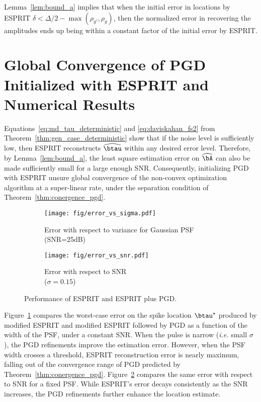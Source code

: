 \documentclass[conference,english]{IEEEtran}
\begin{document}
Lemma~\ref{lem:bound_a} implies that when the initial error in locations by ESPRIT $\delta< \Delta/2 - \max\left({\rho_{g'},\rho_g}\right)$, then the normalized error in recovering the amplitudes ends up being within a constant factor of the initial error by ESPRIT.

\section{Global Convergence of PGD Initialized with ESPRIT and Numerical Results}\label{sec:experiments}


Equations~\eqref{eq:md_tau_deterministic} and \eqref{eq:daviskahan_fs2} from Theorem~\ref{thm:gen_case_deterministic} show that if the noise level is sufficiently low, then ESPRIT reconstructs $\widehat{\btau}$ within any desired error level. Therefore, by Lemma~\ref{lem:bound_a}, the least square estimation error on $\widehat{\bA}$ can also be made sufficiently small for a large enough SNR. Consequently, initializing PGD with ESPRIT unsure global convergence of the non-convex optimization algorithm at a super-linear rate, under the separation condition of  Theorem~\ref{thm:conergence_pgd}.

\begin{figure}[t]
    \centering
    \begin{subfigure}[t]{0.48\columnwidth}
        \centering
        \texttt{[image: fig/error\_vs\_sigma.pdf]}
        \caption{\centering Error with respect to variance 
        for Gaussian PSF (SNR=25dB)}
        \label{fig:error_vs_sigma}
    \end{subfigure}
    \hfill
    \begin{subfigure}[t]{0.48\columnwidth}
    \centering\texttt{[image: fig/error\_vs\_snr.pdf]}
    \caption{Error with respect to SNR \\ \centering ($\sigma = 0.15$)}
    \label{fig:error_vs_snr}
    \end{subfigure}
    \caption{Performance of ESPRIT and ESPRIT plus PGD.} 
    \label{fig:comparison}
\end{figure}

Figure~\ref{fig:error_vs_sigma} compares the worst-case error on the spike location $\btau^\star$ produced by modified ESPRIT and modified ESPRIT followed by PGD as a function of the width of the PSF, under a constant SNR. When the pulse is narrow (\emph{i.e.} small $\sigma$), the PGD refinements improve the estimation error. However, when the PSF width crosses a threshold, ESPRIT reconstruction error is nearly maximum, falling out of the convergence range of PGD predicted by Theorem~\ref{thm:conergence_pgd}.
Figure~\ref{fig:error_vs_snr} compares the same error with respect to SNR for a fixed PSF. While ESPRIT's error decays consistently as the SNR increases, the PGD refinements further enhance the location estimate.
\end{document}
